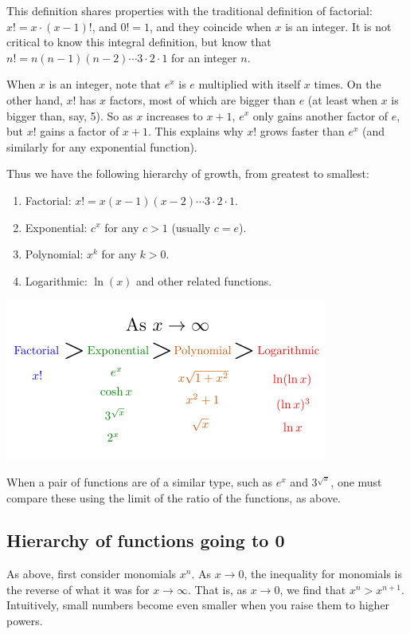 \documentclass[a4paper]{book}
\begin{document}
\begin{sloppypar}
\begin{examplebox}
This definition shares properties with the traditional definition of factorial: $x! = x \cdot (x-1)!$, and $0! = 1$, and they coincide when $x$ is an integer. It is not critical to know this integral definition, but know that $n! = n(n-1)(n-2)\dotsb 3 \cdot 2 \cdot 1$ for an integer $n$.

When $x$ is an integer, note that $e^x$ is $e$ multiplied with itself $x$ times. On the other hand, $x!$ has $x$ factors, most of which are bigger than $e$ (at least when $x$ is bigger than, say, 5). So as $x$ increases to $x+1$, $e^x$ only gains another factor of $e$, but $x!$ gains a factor of $x+1$. This explains why $x!$ grows faster than $e^x$ (and similarly for any exponential function).
\end{examplebox}

Thus we have the following hierarchy of growth, from greatest to smallest:
\begin{enumerate}
	\item Factorial: $x! = x(x-1)(x-2)\dotsm 3 \cdot 2 \cdot 1$.
	\item Exponential: $c^x$ for any $c>1$ (usually $c=e$).
	\item Polynomial: $x^k$ for any $k>0$.
	\item Logarithmic: $\ln(x)$ and other related functions.
\end{enumerate}

\begin{center}\includegraphics[scale=0.6]{OrdersOfGrowth}\end{center}

When a pair of functions are of a similar type, such as $e^x$ and $3^{\sqrt x}$, one must compare these using the limit of the ratio of the functions, as above.

\subsection{Hierarchy of functions going to 0}
As above, first consider monomials $x^n$. As $x \rightarrow 0$, the inequality for monomials is the reverse of what it was for $x \rightarrow \infty$. That is, as $x \rightarrow 0$, we find that $x^n > x^{n+1}$. Intuitively, small numbers become even smaller when you raise them to higher powers.


\end{sloppypar}
\end{document}
